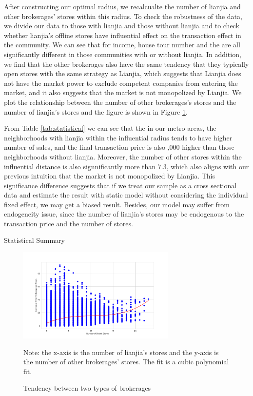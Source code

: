 \documentclass[12pt]{article}
\begin{document}
After constructing our optimal radius, we recalcualte the number of lianjia and other brokerages' stores within this radius. To check the robustness of the data, we divide our data to those with lianjia and those without lianjia and to check whether lianjia's offline stores have influential effect on the transaction effect in the community. We can see that for income, house tour number and the are all significantly different in those communities with or without lianjia. In addition, we find that the other brokerages also have the same tendency that they typically open stores with the same strategy as Lianjia, which suggests that Lianjia does not have the market power to exclude competent companies from entering the market, and it also suggests that the market is not monopolized by Lianjia. We plot the relationship between the number of other brokerages's stores and the number of lianjia's stores and the figure is shown in Figure \ref{fig:same_distribution}.

From Table \ref{tab:statistical} we can see that the in our metro areas, the neighborhoods with lianjia within the influential radius tends to have higher number of sales, and the final transaction price is also ,000 higher than those neighborhoods without lianjia. Moreover, the number of other stores within the influential distance is also signnificantly more than 7.3, which also aligns with our previous intuition that the market is not monopolized by Lianjia.  This significance difference suggests that if we treat our sample as a cross sectional data and estimate the result with static model without considering the individual fixed effect, we may get a biased result. Besides, our model may suffer from endogeneity issue, since the number of lianjia's stores may be endogenous to the transaction price and the number of stores. 

\begin{table}[htb!]
    \centering
    \begin{tiny}
    \caption{Statistical Summary}
    
    \label{tab:statistical}
    \end{tiny}
\end{table}

\begin{figure}
    \centering
    \includegraphics[width=0.7\textwidth]{../figures/scatter_plot_with_two_brokerages.pdf}
    \caption{Tendency between two types of brokerages}
    \label{fig:same_distribution}
    Note: the x-axis is the number of lianjia's stores and the y-axis is the number of other brokerages' stores. The fit is a cubic polynomial fit.
\end{figure}
\end{document}
